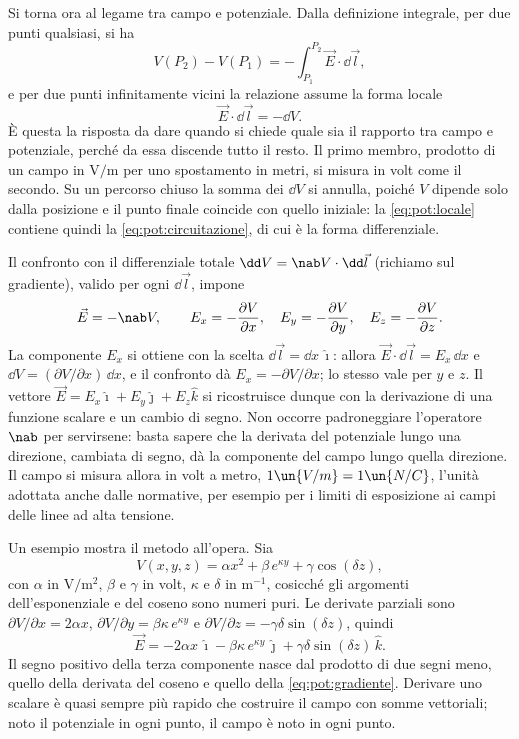 \documentclass[main.tex]{subfiles}
\begin{document}
	Si torna ora al legame tra campo e potenziale. Dalla definizione integrale, per due punti qualsiasi, si ha
	\[
	V(P_2)-V(P_1)=-\int_{P_1}^{P_2}\vec E\cdot\dd\vec l ,
	\]
	e per due punti infinitamente vicini la relazione assume la forma locale
	\begin{equation}\label{eq:pot:locale}
		\vec E\cdot\dd\vec l=-\dd V .
	\end{equation}
	È questa la risposta da dare quando si chiede quale sia il rapporto tra campo e potenziale, perché da essa discende tutto il resto. Il primo membro, prodotto di un campo in $\mathrm{V/m}$ per uno spostamento in metri, si misura in volt come il secondo. Su un percorso chiuso la somma dei $\dd V$ si annulla, poiché $V$ dipende solo dalla posizione e il punto finale coincide con quello iniziale: la \eqref{eq:pot:locale} contiene quindi la \eqref{eq:pot:circuitazione}, di cui è la forma differenziale.
	
	Il confronto con il differenziale totale $\dd V=\nab V\cdot\dd\vec l$ (richiamo sul gradiente), valido per ogni $\dd\vec l$, impone
	\begin{equation}\label{eq:pot:gradiente}
		\vec E=-\nab V ,\qquad
		E_x=-\frac{\partial V}{\partial x},\quad E_y=-\frac{\partial V}{\partial y},\quad E_z=-\frac{\partial V}{\partial z}.
	\end{equation}
	La componente $E_x$ si ottiene con la scelta $\dd\vec l=\dd x\,\hat\imath$: allora $\vec E\cdot\dd\vec l=E_x\,\dd x$ e $\dd V=(\partial V/\partial x)\,\dd x$, e il confronto dà $E_x=-\partial V/\partial x$; lo stesso vale per $y$ e $z$. Il vettore $\vec E=E_x\hat\imath+E_y\hat\jmath+E_z\hat k$ si ricostruisce dunque con la derivazione di una funzione scalare e un cambio di segno. Non occorre padroneggiare l'operatore $\nab$ per servirsene: basta sapere che la derivata del potenziale lungo una direzione, cambiata di segno, dà la componente del campo lungo quella direzione. Il campo si misura allora in volt a metro, $1\un{V/m}=1\un{N/C}$, l'unità adottata anche dalle normative, per esempio per i limiti di esposizione ai campi delle linee ad alta tensione.
	
	Un esempio mostra il metodo all'opera. Sia
	\[
	V(x,y,z)=\alpha x^2+\beta\,e^{\kappa y}+\gamma\cos(\delta z),
	\]
	con $\alpha$ in $\mathrm{V/m^2}$, $\beta$ e $\gamma$ in volt, $\kappa$ e $\delta$ in $\mathrm{m^{-1}}$, cosicché gli argomenti dell'esponenziale e del coseno sono numeri puri.
	Le derivate parziali sono $\partial V/\partial x=2\alpha x$, $\partial V/\partial y=\beta\kappa\,e^{\kappa y}$ e $\partial V/\partial z=-\gamma\delta\sin(\delta z)$, quindi
	\[
	\vec E=-2\alpha x\,\hat\imath-\beta\kappa\,e^{\kappa y}\,\hat\jmath+\gamma\delta\sin(\delta z)\,\hat k .
	\]
	Il segno positivo della terza componente nasce dal prodotto di due segni meno, quello della derivata del coseno e quello della \eqref{eq:pot:gradiente}. Derivare uno scalare è quasi sempre più rapido che costruire il campo con somme vettoriali; noto il potenziale in ogni punto, il campo è noto in ogni punto.
	
\end{document}
